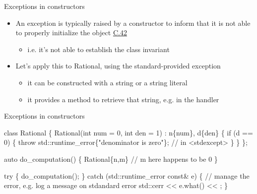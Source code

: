 \begin{frame}[fragile]{Exceptions in constructors}

  \begin{itemize}
  \item An exception is typically raised by a constructor to inform that it is
    not able to properly initialize the object
    \href{https://isocpp.github.io/CppCoreGuidelines/CppCoreGuidelines#c42-if-a-constructor-cannot-construct-a-valid-object-throw-an-exception}{C.42}
    \begin{itemize}
    \item i.e. it's not able to establish the class invariant
    \end{itemize}
  \item Let's apply this to Rational, using the standard-provided exception 
    \begin{itemize}
    \item it can be constructed with a string or a string literal
    \item it provides a  method to retrieve that string, e.g. in
      the handler
    \end{itemize}
  \end{itemize}

\end{frame}

\begin{frame}[fragile]{Exceptions in constructors \insertcontinuationtext}

    \begin{codeblock}
class Rational \{
  \ddd
  Rational(int num = 0, int den = 1) : n\{num\}, d\{den\} \{
    if (d == 0) \{
      \alert{throw} std::runtime_error\{"denominator is zero"\}; // in <stdexcept>
    \}
    \ddd
  \}
\};

auto do_computation() \{
  \ddd
  Rational\{n,m\} // m here happens to be 0
  \ddd  
\}

\alert{try} \{
  do_computation();
  \ddd
\} \alert{catch} (std::runtime_error const& e) \{
  // manage the error, e.g. log a message on stdandard error
  std::cerr << e.what() << \bslashn;
\}\end{codeblock}

\end{frame}

